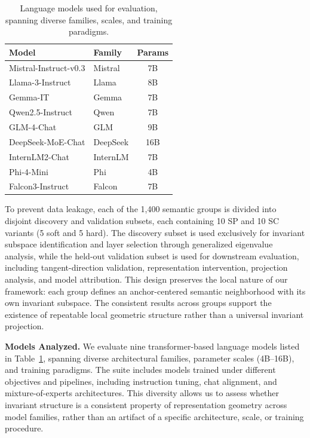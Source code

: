 \begin{table}
\vspace{-1.0em}
\centering
\footnotesize
\setlength{\tabcolsep}{4pt}
\renewcommand{\arraystretch}{1.1}
\begin{tabular}{llc}
\toprule
\textbf{Model} & \textbf{Family} & \textbf{Params} \\
\midrule
Mistral-Instruct-v0.3 & Mistral  & 7B \\
Llama-3-Instruct      & Llama    & 8B \\
Gemma-IT              & Gemma    & 7B \\
Qwen2.5-Instruct      & Qwen     & 7B \\
GLM-4-Chat            & GLM      & 9B \\
DeepSeek-MoE-Chat     & DeepSeek & 16B \\
InternLM2-Chat        & InternLM & 7B \\
Phi-4-Mini            & Phi      & 4B \\
Falcon3-Instruct      & Falcon   & 7B \\
\bottomrule
\end{tabular}
\caption{Language models used for evaluation, spanning diverse families, scales, and training paradigms.}
\label{tab:models}
\vspace{-1.5em}
\end{table}

To prevent data leakage, each of the 1,400 semantic groups is divided into disjoint discovery and validation subsets, each containing 10 SP and 10 SC variants (5 soft and 5 hard). The discovery subset is used exclusively for invariant subspace identification and layer selection through generalized eigenvalue analysis, while the held-out validation subset is used for downstream evaluation, including tangent-direction validation, representation intervention, projection analysis, and model attribution. This design preserves the local nature of our framework: each group defines an anchor-centered semantic neighborhood with its own invariant subspace. The consistent results across groups support the existence of repeatable local geometric structure rather than a universal invariant projection.

\textbf{Models Analyzed.}
We evaluate nine transformer-based language models listed in Table~\ref{tab:models}, spanning diverse architectural families, parameter scales (4B–16B), and training paradigms. The suite includes models trained under different objectives and pipelines, including instruction tuning, chat alignment, and mixture-of-experts architectures. This diversity allows us to assess whether invariant structure is a consistent property of representation geometry across model families, rather than an artifact of a specific architecture, scale, or training procedure.


